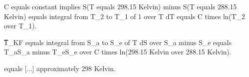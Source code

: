 C equals constant implies S(T equals 298.15 Kelvin) minus S(T equals 288.15 Kelvin) equals integral from T_2 to T_1 of 1 over T dT equals C times ln(T_2 over T_1).  

T̅_KF equals integral from S_a to S_e of T dS over S_a minus S_e equals T_aS_a minus T_eS_e over C times ln(298.15 Kelvin over 288.15 Kelvin).  

equals [...] approximately 298 Kelvin.